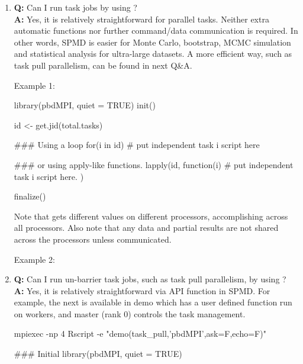 \begin{enumerate}
\item {\bf\color{blue} Q:}
      Can I run task jobs by using ? \\
      {\bf\color{blue} A:}
      Yes, it is relatively straightforward for parallel
      tasks. Neither extra automatic functions nor further
      command/data communication is required.  In other words, SPMD is
      easier for Monte Carlo, bootstrap, MCMC simulation and
      statistical analysis for ultra-large datasets.
      A more efficient way, such as task pull parallelism, can be found
      in next Q\&A.

Example 1:
\begin{Code}[title=SPMD R Script]
  library(pbdMPI, quiet = TRUE)
  init()

  id <- get.jid(total.tasks)

  ### Using a loop
  for(i in id){
    # put independent task i script here
  }

  ### or using apply-like functions.
  lapply(id, function(i){
    # put independent task i script here.
  })

  finalize()
\end{Code}

Note that  gets different values on different processors,
accomplishing  across all processors. Also note that
any data and partial results are not shared across the processors
unless communicated.

Example 2:


\item {\bf\color{blue} Q:}
      Can I run un-barrier task jobs, such as task pull parallelism,
      by using ? \\
      {\bf\color{blue} A:}
      Yes, it is relatively straightforward via  API function
       in SPMD. For example, the next is available
      in demo which has a user
      defined function  run on workers, and master (rank 0)
      controls the task management.
\begin{Command}
mpiexec -np 4 Rscript -e "demo(task_pull,'pbdMPI',ask=F,echo=F)"
\end{Command}
\begin{Code}[title=SPMD R Script (task\_pull)]
### Initial
library(pbdMPI, quiet = TRUE)


\end{Code}
\end{enumerate}
